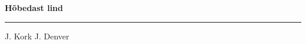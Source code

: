 \documentclass[10pt]{book}
\begin{document}
{
  \samepage
  \raggedbottom
  \raggedright
  \sloppy


  \vspace{0.2in}

  \noindent\begin{minipage}{.1\textwidth}
    \hfill\vspace{0.1in}
  \end{minipage}%
  \noindent\begin{minipage}{.8\textwidth}
    \centering
    \bfseries
    \large H\~obedast lind
  \end{minipage}%
  \noindent\begin{minipage}{.1\textwidth}
      \hfill\vspace{0.1in}
  \end{minipage}

  \nopagebreak[4]
  \vspace{0.1in}
  \nopagebreak[4]
  \hrule height 0.05ex
  \nopagebreak[4]
  \vspace{-0.05in}

  {\footnotesize J. Kork \hfill J. Denver }\\
  \vspace{0.01in}



}
\end{document}
